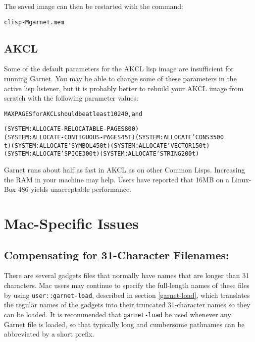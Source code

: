 \documentclass{report}
\begin{document}
The saved image can then be restarted with the command:

\begin{alltt}
clisp -M garnet.mem
\end{alltt}



\subsection{AKCL}

Some of the default parameters for the AKCL lisp image are
insufficient for running Garnet.  You may be able to change some of
these parameters in the active lisp listener, but it is probably
better to rebuild your AKCL image from scratch with the following
parameter values:

\begin{alltt}
  MAXPAGES for AKCL should be at least 10240, and
  
  (SYSTEM:ALLOCATE-RELOCATABLE-PAGES 800)
  (SYSTEM:ALLOCATE-CONTIGUOUS-PAGES 45 T) (SYSTEM:ALLOCATE 'CONS 3500
  t) (SYSTEM:ALLOCATE 'SYMBOL 450 t) (SYSTEM:ALLOCATE 'VECTOR 150 t)
  (SYSTEM:ALLOCATE 'SPICE 300 t) (SYSTEM:ALLOCATE 'STRING 200 t)
\end{alltt}

Garnet runs about half as fast in AKCL as on other Common Lisps.
Increasing the RAM in your machine may help.  Users have reported that
16MB on a Linux-Box 486 yields unacceptable performance.



\section{Mac-Specific Issues}

\subsection{Compensating for 31-Character Filenames:}
There are several gadgets files that normally have names that are
longer than 31 characters.  Mac users may continue to specify the
full-length names of these files by using \texttt{user::garnet-load},
described in section \ref{garnet-load}, which translates the regular
names of the gadgets into their truncated 31-character names so they
can be loaded.  It is recommended that \texttt{garnet-load} be used
whenever any Garnet file is loaded, so that typically long and
cumbersome pathnames can be abbreviated by a short prefix.
\end{document}

